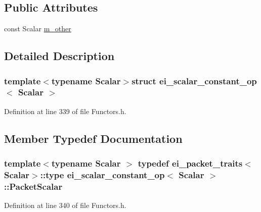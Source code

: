 \subsection*{Public Attributes}
\begin{DoxyCompactItemize}
\item 
const Scalar \hyperlink{structei__scalar__constant__op_af8f40e3a9b4bd2473fc43cc9a2962572}{m\-\_\-other}
\end{DoxyCompactItemize}


\subsection{Detailed Description}
\subsubsection*{template$<$typename Scalar$>$struct ei\-\_\-scalar\-\_\-constant\-\_\-op$<$ Scalar $>$}



Definition at line 339 of file Functors.\-h.



\subsection{Member Typedef Documentation}
\hypertarget{structei__scalar__constant__op_a9bd1c6266777bf97c46f4fc0e9f43a4b}{
\subsubsection[{Packet\-Scalar}]{\setlength{\rightskip}{0pt plus 5cm}template$<$typename Scalar $>$ typedef {\bf ei\-\_\-packet\-\_\-traits}$<$Scalar$>$\-::{\bf type} {\bf ei\-\_\-scalar\-\_\-constant\-\_\-op}$<$ Scalar $>$\-::{\bf Packet\-Scalar}}}\label{structei__scalar__constant__op_a9bd1c6266777bf97c46f4fc0e9f43a4b}


Definition at line 340 of file Functors.\-h.



